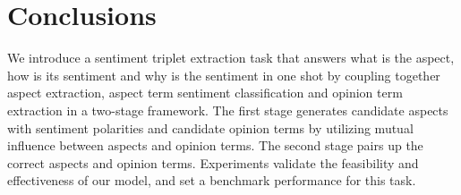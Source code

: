 \documentclass[letterpaper]{article} \usepackage{aaai20}  \usepackage{times}  \usepackage{helvet} \usepackage{courier}  \usepackage[hyphens]{url}  \usepackage{graphicx} \urlstyle{rm} \def\UrlFont{\rm}  \usepackage{graphicx}  \frenchspacing  \setlength{\pdfpagewidth}{8.5in}  \setlength{\pdfpageheight}{11in}
\begin{document}
\section{Conclusions}\label{sec:conclusion}
We introduce a sentiment triplet extraction task that answers what is the aspect, how is its sentiment and why is the sentiment in one shot by coupling together aspect extraction, aspect term sentiment classification and opinion term extraction in a two-stage framework. The first stage generates candidate aspects with sentiment polarities and candidate opinion terms by utilizing mutual influence between aspects and opinion terms. The second stage pairs up the correct aspects and opinion terms. Experiments validate the feasibility and effectiveness of our model, and set a benchmark performance for this task. 

\begin{small}



\end{small}
\end{document}
